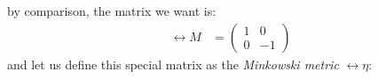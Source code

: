 by comparison, the matrix we want is:
\begin{align}
  \rel{M} & = \begin{pmatrix}
                1 & 0  \\
                0 & -1
              \end{pmatrix}
\end{align}
and let us define this special matrix as the \emph{Minkowski metric} $\rel{\eta}$:


